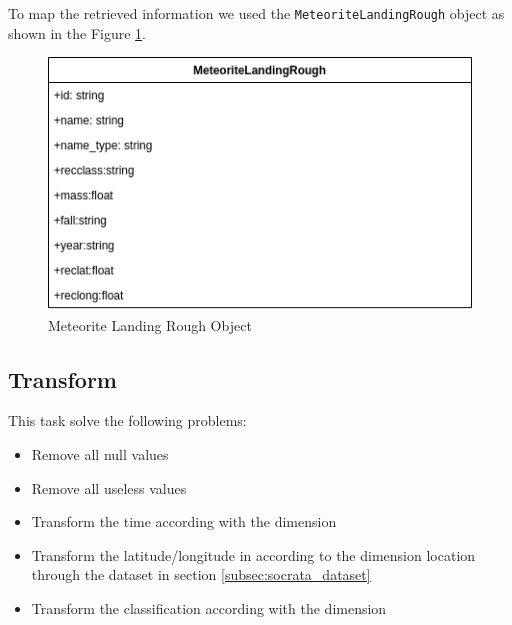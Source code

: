 \documentclass[conference]{IEEEtran}
\begin{document}
	To map the retrieved information we used the \texttt{MeteoriteLandingRough} object as shown in the Figure \ref{fig:MeteoriteLandingRough}.
	\begin{figure}[htpb]
		\centering
		\includegraphics[width=\columnwidth]{images/meteorite_landing_rough.png}
		\caption{Meteorite Landing Rough Object}
		\label{fig:MeteoriteLandingRough}
	\end{figure}
	
	\subsection{Transform}
	This task solve the following problems:
	\begin{itemize}
		\item Remove all null values
		\item Remove all useless values
		\item Transform the time according with the dimension
		\item Transform the latitude/longitude in according to the dimension location through the dataset in section \ref{subsec:socrata_dataset}
		\item Transform the classification according with the dimension
	\end{itemize}
	
\end{document}
